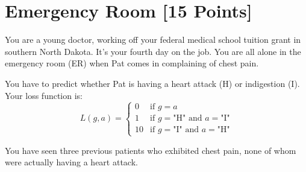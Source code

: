 \documentclass[11pt]{exam}
\begin{document}


\section{Emergency Room [15 Points]}

You are a young doctor, working off your federal medical school
tuition grant in southern North Dakota.  It's your fourth day on the
job.  You are all alone in the emergency room (ER) when Pat comes in
complaining of chest pain.

You have to predict whether Pat is having a heart attack (H) or
indigestion (I).  Your loss function is:
\[L(g, a) = \begin{cases}
         0 & \text{if $g = a$} \\
         1 & \text{if $g = $"H" and $a = $"I"} \\
         10 & \text{if $g = $"I" and $a = $"H"}
\end{cases}
\]

You have seen three previous patients who exhibited chest pain,
none of whom were actually having a heart attack.
\end{document}
